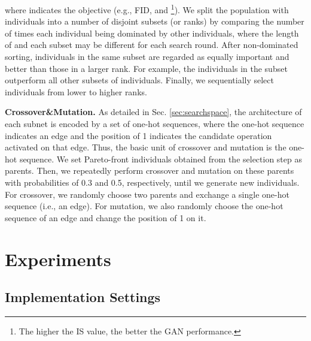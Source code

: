 \documentclass[runningheads]{llncs}
\begin{document}
\noindent where  indicates the objective (e.g., FID, and \footnote{The higher the IS value, the better the GAN performance.}). We split the population with  individuals into a number of disjoint subsets (or ranks)  by comparing the number of times each individual being dominated by other individuals, where the length of  and each subset may be different for each search round. After non-dominated sorting, individuals in the same subset are regarded as equally important and better than those in a larger rank. For example, the individuals in the subset  outperform all other subsets of individuals. Finally, we sequentially select  individuals from lower to higher ranks.







\textbf{Crossover\&Mutation.} As detailed in Sec. \ref{sec:searchspace}, the architecture of each subnet is encoded by a set of one-hot sequences, where the one-hot sequence indicates an edge and the position of 1 indicates the candidate operation activated on that edge. Thus, the basic unit of crossover and mutation is the one-hot sequence. We set  Pareto-front individuals obtained from the selection step as parents. Then, we repeatedly perform crossover and mutation on these parents with probabilities of 0.3 and 0.5, respectively, until we generate  new individuals. For crossover, we randomly choose two parents and exchange a single one-hot sequence (i.e., an edge). For mutation, we also randomly choose the one-hot sequence of an edge and change the position of 1 on it.













\section{Experiments}











\subsection{Implementation Settings}
\end{document}
